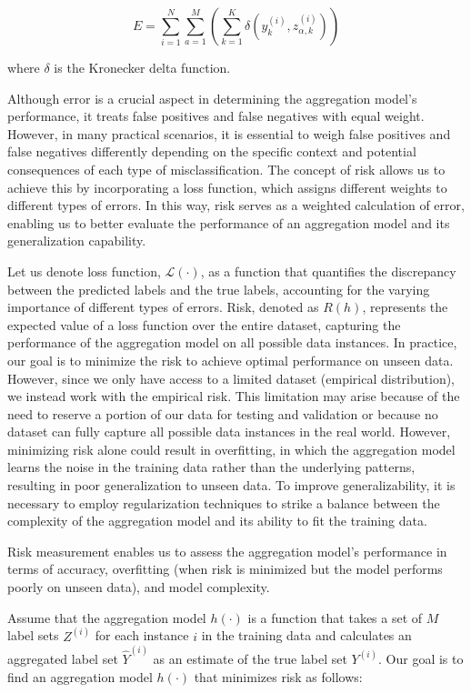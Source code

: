 \documentclass[pdflatex,bst/sn-basic]{bst/sn-jnl}%
\begin{document}
\begin{equation}
E = \sum_{i=1}^N \sum_{a=1}^M \left( \sum_{k=1}^K \delta\left(y_k^{(i)}, z_{\alpha,k}^{(i)}\right) \right)
\label{crowd.Eq.1.risk.error}
\end{equation}

where $\delta $ is the Kronecker delta function.

Although error is a crucial aspect in determining the aggregation model's performance, it treats false positives and false negatives with equal weight. However, in many practical scenarios, it is essential to weigh false positives and false negatives differently depending on the specific context and potential consequences of each type of misclassification. The concept of risk allows us to achieve this by incorporating a loss function, which assigns different weights to different types of errors. In this way, risk serves as a weighted calculation of error, enabling us to better evaluate the performance of an aggregation model and its generalization capability.

Let us denote loss function, $\mathcal{L}(\cdot)$, as a function that quantifies the discrepancy between the predicted labels and the true labels, accounting for the varying importance of different types of errors.
Risk, denoted as $R(h) $, represents the expected value of a loss  function over the entire dataset, capturing the performance of the aggregation model on all possible data instances.  In practice, our goal is to minimize the risk to achieve optimal performance on unseen data. However, since we only have access to a limited dataset (empirical distribution), we instead work with the empirical risk. This limitation may arise because of the need to reserve a portion of our data for testing and validation or because no dataset can fully capture all possible data instances in the real world. However, minimizing risk alone could result in overfitting, in which the aggregation model learns the noise in the training data rather than the underlying patterns, resulting in poor generalization to unseen data. To improve generalizability, it is necessary to employ regularization techniques to strike a balance between the complexity of the aggregation model and its ability to fit the training data.

Risk measurement enables us to assess the aggregation model's performance in terms of accuracy, overfitting (when risk is minimized but the model performs poorly on unseen data), and model complexity.

Assume that the aggregation model $h (\cdot) $ is a function that takes a set of $M $ label sets $Z^{(i)} $ for each instance $i $ in the training data and calculates an aggregated label set $\widehat{Y}^{(i)} $ as an estimate of the true label set $Y^{(i)} $. Our goal is to find an aggregation model $h(\cdot) $ that minimizes risk as follows:
\end{document}
